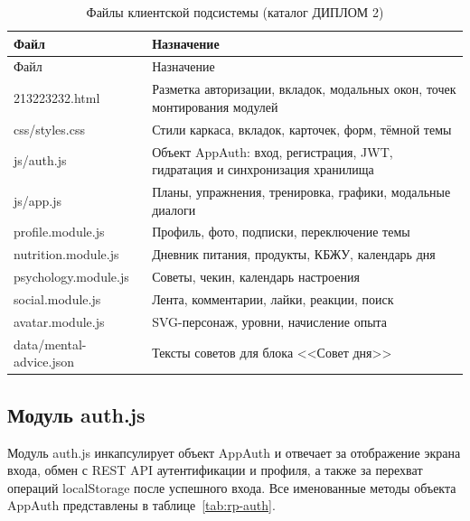 \begin{xltabular}{\textwidth}{|p{4.6cm}|X|}
	\caption{Файлы клиентской подсистемы (каталог ДИПЛОМ 2)\label{tab:rp-files}}\\
	\hline \centrow Файл & \centrow Назначение \\ \hline
	\endfirsthead
	\centrow Файл & \centrow Назначение \\ \hline
	\finishhead
	213223232.html & Разметка авторизации, вкладок, модальных окон, точек монтирования модулей \\ \hline
	css/styles.css & Стили каркаса, вкладок, карточек, форм, тёмной темы \\ \hline
	js/auth.js & Объект AppAuth: вход, регистрация, JWT, гидратация и синхронизация хранилища \\ \hline
	js/app.js & Планы, упражнения, тренировка, графики, модальные диалоги \\ \hline
	profile.module.js & Профиль, фото, подписки, переключение темы \\ \hline
	nutrition.module.js & Дневник питания, продукты, КБЖУ, календарь дня \\ \hline
	psychology.module.js & Советы, чекин, календарь настроения \\ \hline
	social.module.js & Лента, комментарии, лайки, реакции, поиск \\ \hline
	avatar.module.js & SVG-персонаж, уровни, начисление опыта \\ \hline
	data/mental-advice.json & Тексты советов для блока <<Совет дня>> \\ \hline
\end{xltabular}

\subsection{Модуль auth.js}

Модуль auth.js инкапсулирует объект AppAuth и отвечает за отображение экрана входа, обмен с REST API аутентификации и профиля, а также за перехват операций localStorage после успешного входа. Все именованные методы объекта AppAuth представлены в таблице~\ref{tab:rp-auth}.

